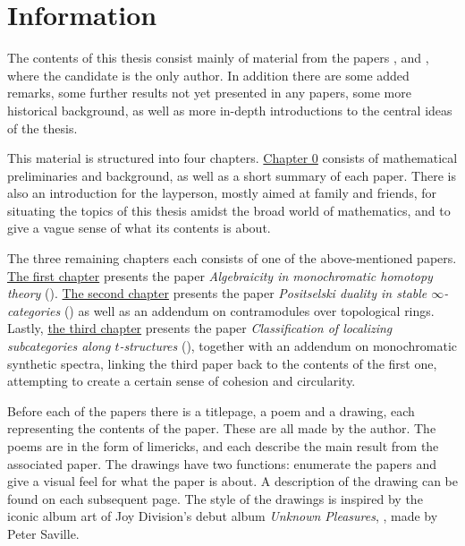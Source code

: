 
\section*{Information}

The contents of this thesis consist mainly of material from the papers \cite{aambo_2024_algebraicity}, \cite{aambo_2024_positselski} and \cite{aambo_2024_localizing}, where the candidate is the only author. In addition there are some added remarks, some further results not yet presented in any papers, some more historical background, as well as more in-depth introductions to the central ideas of the thesis. 

This material is structured into four chapters. \hyperref[ch0]{Chapter 0} consists of mathematical preliminaries and background, as well as a short summary of each paper. There is also an introduction for the layperson, mostly aimed at family and friends, for situating the topics of this thesis amidst the broad world of mathematics, and to give a vague sense of what its contents is about.  

The three remaining chapters each consists of one of the above-mentioned papers. \hyperref[ch1]{The first chapter} presents the paper \emph{Algebraicity in monochromatic homotopy theory} (\cite{aambo_2024_algebraicity}). \hyperref[ch2]{The second chapter} presents the paper \emph{Positselski duality in stable $\infty$-categories} (\cite{aambo_2024_positselski}) as well as an addendum on contramodules over topological rings. Lastly, \hyperref[ch3]{the third chapter} presents the paper \emph{Classification of localizing subcategories along $t$-structures} (\cite{aambo_2024_localizing}), together with an addendum on monochromatic synthetic spectra, linking the third paper back to the contents of the first one, attempting to create a certain sense of cohesion and circularity. 

Before each of the papers there is a titlepage, a poem and a drawing, each representing the contents of the paper. These are all made by the author. The poems are in the form of limericks, and each describe the main result from the associated paper. The drawings have two functions: enumerate the papers and give a visual feel for what the paper is about. A description of the drawing can be found on each subsequent page. The style of the drawings is inspired by the iconic album art of Joy Division's debut album \emph{Unknown Pleasures}, \cite{joy-division_79}, made by Peter Saville. 
